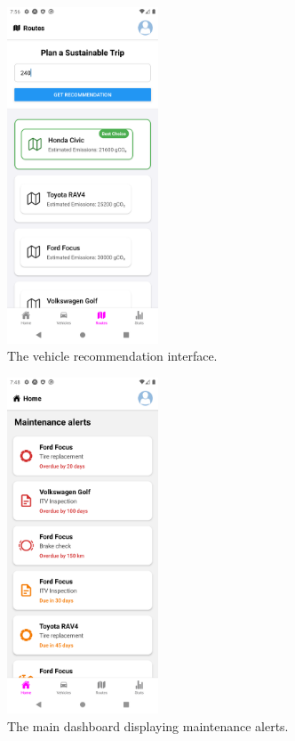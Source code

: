 \begin{figure}[H]
    \centering
    \includegraphics[width=0.4\textwidth]{images/mobile/routes.png}
    \caption{The vehicle recommendation interface.}
    \label{fig:recommendation-screen}
\end{figure}

\begin{figure}[H]
    \centering
    \includegraphics[width=0.4\textwidth]{images/mobile/maintenance.png}
    \caption{The main dashboard displaying maintenance alerts.}
    \label{fig:maintenance-screen}
\end{figure}

